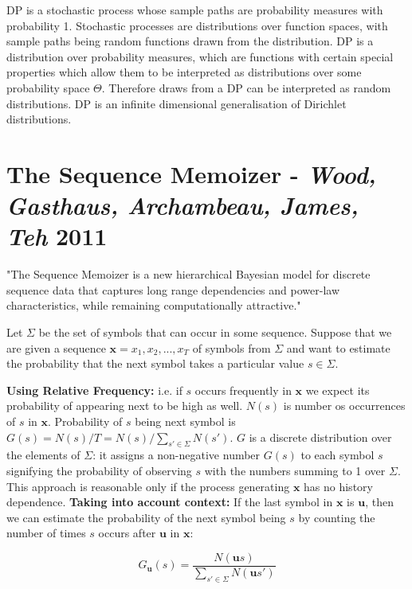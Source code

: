 DP is a stochastic process whose sample paths are probability measures with probability 1. Stochastic processes are distributions over function spaces, with sample paths being random functions drawn from the distribution. DP is a distribution over probability measures, which are functions with certain special properties which allow them to be interpreted as distributions over some probability space $\Theta$. Therefore draws from a DP can be interpreted as random distributions. DP is an infinite dimensional generalisation of Dirichlet distributions.

\section{The Sequence Memoizer - \textit{Wood, Gasthaus, Archambeau, James, Teh} 2011}

"The Sequence Memoizer is a new hierarchical Bayesian model for discrete sequence data that captures long range dependencies and power-law characteristics, while remaining computationally attractive."

Let $\Sigma$ be the set of symbols that can occur in some sequence. Suppose that we are given a sequence $\boldsymbol{x}=x_{1}, x_{2}, ..., x_{T}$ of symbols from $\Sigma$ and want to estimate the probability that the next symbol takes a particular value $s \in \Sigma$.

\textbf{Using Relative Frequency:} i.e. if $s$ occurs frequently in $\boldsymbol{x}$ we expect its probability of appearing next to be high as well. $N(s)$ is number os occurrences of $s$ in $\boldsymbol{x}$. Probability of $s$ being next symbol is $G(s)=N(s)/T=N(s)/\sum_{s' \in \Sigma}N(s')$. $G$ is a discrete distribution over the elements of $\Sigma$: it assigns a non-negative number $G(s)$ to each symbol $s$ signifying the probability of observing $s$ with the numbers summing to 1 over $\Sigma$. This approach is reasonable only if the process generating $\boldsymbol{x}$ has no history dependence. 
\textbf{Taking into account context:} If the last symbol in $\boldsymbol{x}$ is $\boldsymbol{u}$, then we can estimate the probability of the next symbol being $s$ by counting the number of times $s$ occurs after $\boldsymbol{u}$ in $\boldsymbol{x}$:

\begin{equation}
G_{\boldsymbol{u}}(s)=\frac{N(\boldsymbol{u}s)}{\sum_{s' \in \Sigma}N(\boldsymbol{u}s')}
\label{eq:seqMemRelativeFreqContext}
\end{equation}

